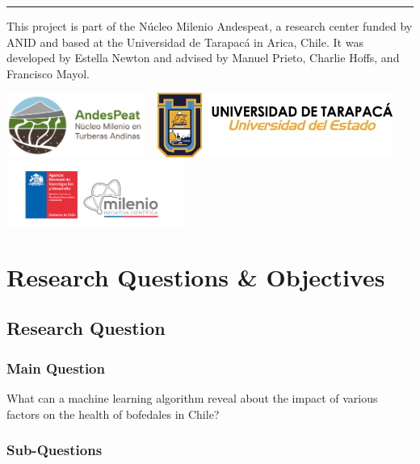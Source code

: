 \documentclass[
  letterpaper,
  DIV=11,
  numbers=noendperiod]{scrreprt}
\begin{document}
\begin{center}\rule{0.5\linewidth}{0.5pt}\end{center}

This project is part of the Núcleo Milenio Andespeat, a research center
funded by ANID and based at the Universidad de Tarapacá in Arica, Chile.
It was developed by Estella Newton and advised by Manuel Prieto, Charlie
Hoffs, and Francisco Mayol.

\includegraphics[width=\linewidth,height=0.83333in,keepaspectratio]{images/AndesPeatLogo.png}
~
\includegraphics[width=\linewidth,height=0.83333in,keepaspectratio]{images/UniversityOfTarapacaLogo.png}
~
\includegraphics[width=\linewidth,height=0.83333in,keepaspectratio]{images/ANIDLogo.png}


\chapter{Research Questions \&
Objectives}\label{research-questions-objectives}

\section{Research Question}\label{research-question}

\subsection{Main Question}\label{main-question}

What can a machine learning algorithm reveal about the impact of various
factors on the health of bofedales in Chile?

\subsection{Sub-Questions}\label{sub-questions}
\end{document}
